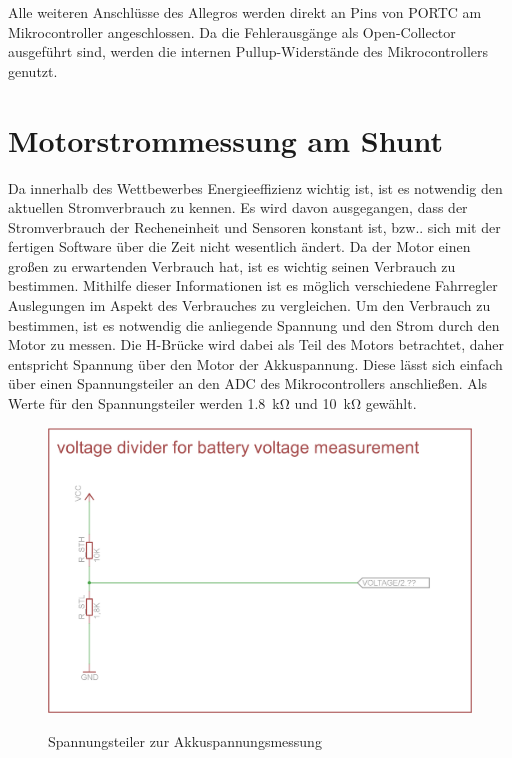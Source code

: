 Alle weiteren Anschlüsse des Allegros werden direkt an Pins von PORTC am Mikrocontroller angeschlossen. Da die Fehlerausgänge als Open-Col\-lec\-tor ausgeführt sind, werden die internen Pullup-Widerstände des Mikrocontrollers genutzt.

\section{Motorstrommessung am Shunt}

Da innerhalb des Wettbewerbes Energieeffizienz wichtig ist, ist es notwendig den aktuellen Stromverbrauch zu kennen. Es wird davon ausgegangen, dass der Stromverbrauch der Recheneinheit und Sensoren
konstant ist, bzw.. sich mit der fertigen Software über die Zeit nicht wesentlich ändert. Da der Motor einen großen zu erwartenden Verbrauch hat, ist es wichtig seinen Verbrauch zu bestimmen. Mithilfe dieser
Informationen ist es möglich verschiedene Fahrregler Auslegungen im Aspekt des Verbrauches zu vergleichen. Um den Verbrauch zu bestimmen, ist es notwendig die anliegende Spannung und den Strom durch den
Motor zu messen. Die H-Brücke wird dabei als Teil des Motors betrachtet, daher entspricht Spannung über den Motor der Akkuspannung. Diese lässt sich einfach über einen Spannungsteiler an den ADC des Mikrocontrollers
anschließen. Als Werte für den Spannungsteiler werden \SI{1,8}{\kilo\ohm} und \SI{10}{\kilo\ohm} gewählt.

\begin{figure}[H]
\centering
\includegraphics[width=\textwidth]{spannungsteiler.png}\\
\caption{Spannungsteiler zur Akkuspannungsmessung}%
\label{fig:Spannungsteiler}
\end{figure}

